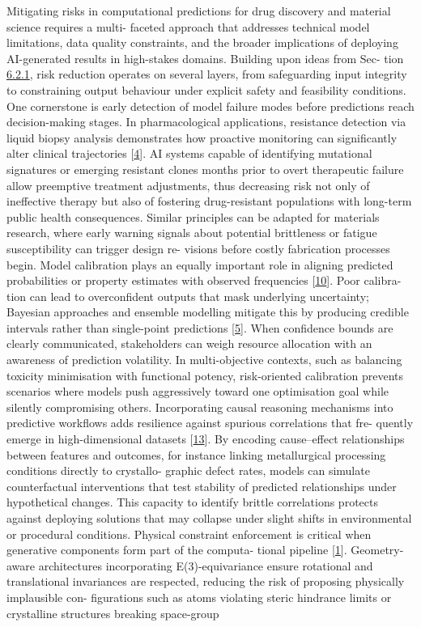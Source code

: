 \documentclass[
]{article}
\begin{document}
Mitigating risks in computational predictions for drug discovery and
material science requires a multi- faceted approach that addresses
technical model limitations, data quality constraints, and the broader
implications of deploying AI-generated results in high-stakes domains.
Building upon ideas from Sec- tion
\hyperref[transparency-and-interpretability-of-ai-models]{6.2.1}, risk
reduction operates on several layers, from safeguarding input integrity
to constraining output behaviour under explicit safety and feasibility
conditions. One cornerstone is early detection of model failure modes
before predictions reach decision-making stages. In pharmacological
applications, resistance detection via liquid biopsy analysis
demonstrates how proactive monitoring can significantly alter clinical
trajectories {[}\hyperref[_bookmark44]{4}{]}. AI systems capable of
identifying mutational signatures or emerging resistant clones months
prior to overt therapeutic failure allow preemptive treatment
adjustments, thus decreasing risk not only of ineffective therapy but
also of fostering drug-resistant populations with long-term public
health consequences. Similar principles can be adapted for materials
research, where early warning signals about potential brittleness or
fatigue susceptibility can trigger design re- visions before costly
fabrication processes begin. Model calibration plays an equally
important role in aligning predicted probabilities or property estimates
with observed frequencies {[}\hyperref[_bookmark50]{10}{]}. Poor
calibra- tion can lead to overconfident outputs that mask underlying
uncertainty; Bayesian approaches and ensemble modelling mitigate this by
producing credible intervals rather than single-point predictions
{[}\hyperref[_bookmark45]{5}{]}. When confidence bounds are clearly
communicated, stakeholders can weigh resource allocation with an
awareness of prediction volatility. In multi-objective contexts, such as
balancing toxicity minimisation with functional potency, risk-oriented
calibration prevents scenarios where models push aggressively toward one
optimisation goal while silently compromising others. Incorporating
causal reasoning mechanisms into predictive workflows adds resilience
against spurious correlations that fre- quently emerge in
high-dimensional datasets {[}\hyperref[_bookmark53]{13}{]}. By encoding
cause--effect relationships between features and outcomes, for instance
linking metallurgical processing conditions directly to crystallo-
graphic defect rates, models can simulate counterfactual interventions
that test stability of predicted relationships under hypothetical
changes. This capacity to identify brittle correlations protects against
deploying solutions that may collapse under slight shifts in
environmental or procedural conditions. Physical constraint enforcement
is critical when generative components form part of the computa- tional
pipeline {[}\hyperref[_bookmark41]{1}{]}. Geometry-aware architectures
incorporating E(3)-equivariance ensure rotational and translational
invariances are respected, reducing the risk of proposing physically
implausible con- figurations such as atoms violating steric hindrance
limits or crystalline structures breaking space-group
\end{document}
